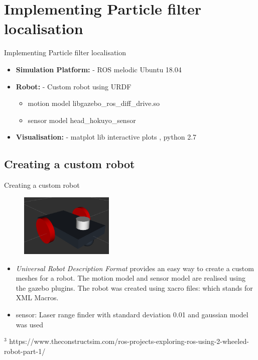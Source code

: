 \documentclass{beamer}
\begin{document}
\section{Implementing Particle filter localisation}
\begin{frame}{Implementing Particle filter localisation}
    \begin{itemize}
        \item \textbf{Simulation Platform: } - ROS melodic Ubuntu 18.04 
        \item \textbf{Robot: } - Custom robot using URDF
        \begin{itemize}
            \item motion model libgazebo\_ros\_diff\_drive.so 
            \item sensor model head\_hokuyo\_sensor
        \end{itemize}
        \item \textbf{Visualisation: } - matplot lib interactive plots , python 2.7
    \end{itemize}
\end{frame}

\subsection{Creating a custom robot}
\begin{frame}{Creating a custom robot}
    \begin{figure}
        \centering
        \includegraphics[height=30mm]{./custom_robot.png}
    \end{figure}
    \begin{itemize}
    \item \textit{Universal Robot Description Format} provides an easy way to create a custom meshes for a robot. The motion model and sensor model are realised using the gazebo plugins. The robot was created using xacro files: which stands for XML Macros. 
    \item sensor: Laser range finder with standard deviation 0.01 and gaussian model was used
    \end{itemize}
    \vfill
    \tiny{$^{3}$} https://www.theconstructsim.com/ros-projects-exploring-ros-using-2-wheeled-robot-part-1/
\end{frame}
\end{document}
